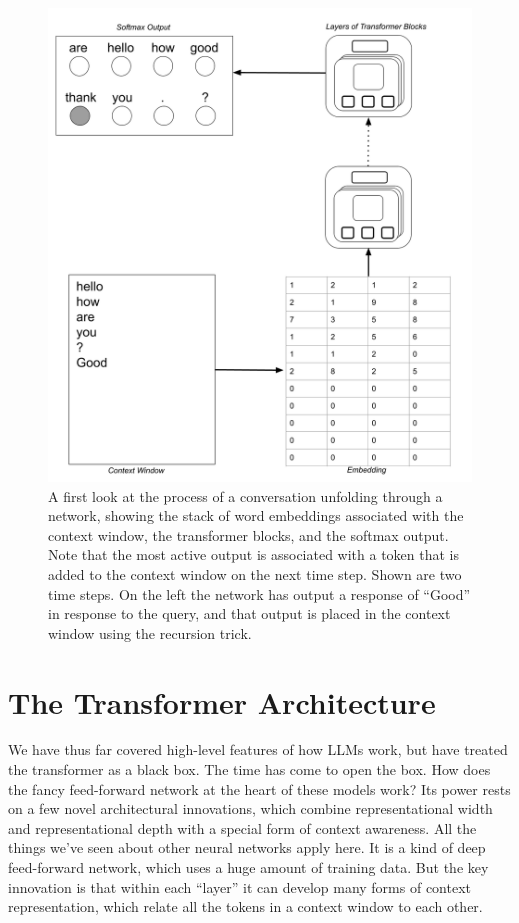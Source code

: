 \begin{figure}[h]
\includegraphics[scale=.2]{./images/TransformerOverview2.png}
\caption[Jeff Yoshimi]{A first look at the process of a conversation unfolding through a network, showing the stack of word embeddings associated with the context window, the transformer blocks, and the softmax output. Note that the most active output is associated with a token that is added to the context window on the next time step. Shown are two time steps. On the left the network has output a response of ``Good'' in response to the query, and that output is placed in the context window using the recursion trick.}
\label{transformerOverview}
\end{figure}

\section{The Transformer Architecture}\label{transformers}

 
We have thus far covered high-level features of how LLMs work, but have treated the transformer as a black box. The time has come to open the box. How does the fancy feed-forward network at the heart of these models work? Its power rests on a few novel architectural innovations, which combine representational width and representational depth with a special form of context awareness. All the things we've seen about other neural networks apply here. It is a kind of deep feed-forward network, which uses a huge amount of training data. But the key innovation is that within each ``layer'' it can develop many forms of context representation, which relate all the tokens in a context window to each other.


